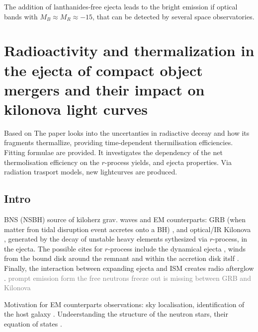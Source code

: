 \documentclass[11pt,a4paper,headinclude=true,DIV=14,BCOR=8mm,chapterprefix,listof=totoc,twoside,openright,abstracton]{scrbook}
\newcommand{\gray}[1]{\textcolor{gray}{#1}}
\begin{document}
The addition of lanthanides-free ejecta leads to the bright emission if optical bands with $M_{B}\approx M_{R} \approx -15$, that can be detected by several space observatories.  


\section{Radioactivity and thermalization in the ejecta of compact object mergers and their impact on kilonova light curves}

Based on \cite{Barnes, Kasen,Wu, & Martinez-Pinedo (2016)}
The paper looks into the uncertanties in radiactive deceay and how its fragments thermallize, providing time-dependent thermilisation efficiencies. Fitting formulae are provided. It investigates the dependency of the net thermolisation efficiency on the $r$-process yields, and ejecta properties. Via radiation trasport models, new lightcurves are produced. 


\subsection{Intro}

BNS (NSBH) source of kiloherz grav. waves \cite{(Abadie et al. 2010)} and EM counterparts: GRB (when matter fron tidal disruption event accretes onto a BH) \cite{(Paczynski 1986; Eichler et al. 1989a; Narayan et al. 1992)} , and optical/IR Kilonova \cite{(Li & Paczynski 1998; Metzger et al. 2010; Roberts et al. 2011; Barnes & Kasen 2013)}, generated by the decay of unstable heavy elements sythesized via $r$-process, \cite{Arnould et al. 2007} in the ejecta. The possible cites for $r$-process include the dynamical ejecta \cite{(Lattimer & Schramm 1974, 1976; Freiburghaus et al. 1999; Korobkin et al. 2012; Rosswog et al. 1999; Goriely et al. 2011)}, winds from the bound disk around the remnant \cite{(Fernandez & Metzger 2013; Perego et al. 2014; Just et al. 2015)} and within the accretion disk itslf \cite{[not here]}. 
Finally, the interaction between expanding ejecta and ISM creates radio afterglow \cite{(Nakar & Piran 2011)}. 
\gray{prompt emission form the free neutrons freeze out is missing between GRB and Kilonova}

Motivation for EM counterparts observations: 
sky localisation, identification of the host galaxy \cite{(Nissanke et al. 2013b; Kasliwal & Nissanke 2014; Holz & Hughes 2005; Dalal et al. 2006)}. Undeerstanding the structure of the neutron stars, their equation of states \cite{(Bauswein et al. 2013; Hotokezaka et al. 2013b; Bauswein et al. 2015)}.
\end{document}
